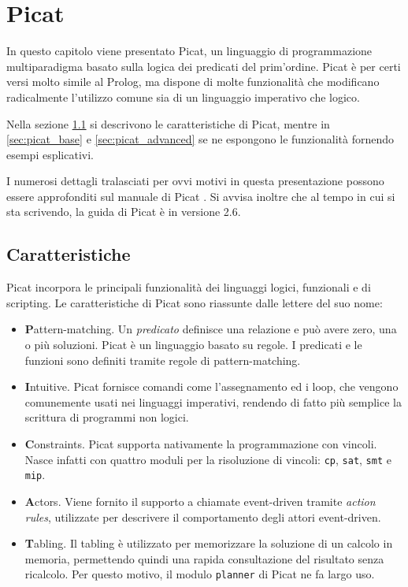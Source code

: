 \documentclass[12pt,a4paper,openright]{book} %
\begin{document}
\chapter{Picat}
\label{ch:picat}


In questo capitolo viene presentato Picat, un linguaggio di
programmazione multiparadigma basato sulla logica dei predicati del
prim'ordine. Picat è per certi versi molto simile al Prolog, ma
dispone di molte funzionalità che modificano radicalmente l'utilizzo
comune sia di un linguaggio imperativo che logico.

Nella sezione \ref{sec:picat_features} si descrivono le
caratteristiche di Picat, mentre in \ref{sec:picat_base} e
\ref{sec:picat_advanced} se ne espongono le funzionalità fornendo
esempi esplicativi.

I numerosi dettagli tralasciati per ovvi motivi in questa
presentazione possono essere approfonditi sul manuale di Picat
\cite{PicatGuide}. Si avvisa inoltre che al tempo in cui si sta
scrivendo, la guida di Picat è in versione 2.6.

\section{Caratteristiche}
\label{sec:picat_features}

Picat incorpora le principali funzionalità dei linguaggi logici,
funzionali e di scripting. Le caratteristiche di Picat sono riassunte
dalle lettere del suo nome:
\begin{itemize}
\item \textbf{P}attern-matching. Un \emph{predicato} definisce una
  relazione e può avere zero, una o più soluzioni. Picat è un
  linguaggio basato su regole. I predicati e le funzioni sono definiti
  tramite regole di pattern-matching.
\item \textbf{I}ntuitive. Picat fornisce comandi come l'assegnamento
  ed i loop, che vengono comunemente usati nei linguaggi imperativi,
  rendendo di fatto più semplice la scrittura di programmi non logici.
\item \textbf{C}onstraints. Picat supporta nativamente la programmazione con
  vincoli. Nasce infatti con quattro moduli per la risoluzione di
  vincoli: \verb|cp|, \verb|sat|, \verb|smt| e \verb|mip|.
\item \textbf{A}ctors. Viene fornito il supporto a chiamate
  event-driven tramite \emph{action rules}, utilizzate per descrivere
  il comportamento degli attori event-driven.
\item \textbf{T}abling. Il tabling è utilizzato per memorizzare la
  soluzione di un calcolo in memoria, permettendo quindi una rapida
  consultazione del risultato senza ricalcolo. Per questo motivo, il
  modulo \verb|planner| di Picat ne fa largo uso.
\end{itemize}
\end{document}
